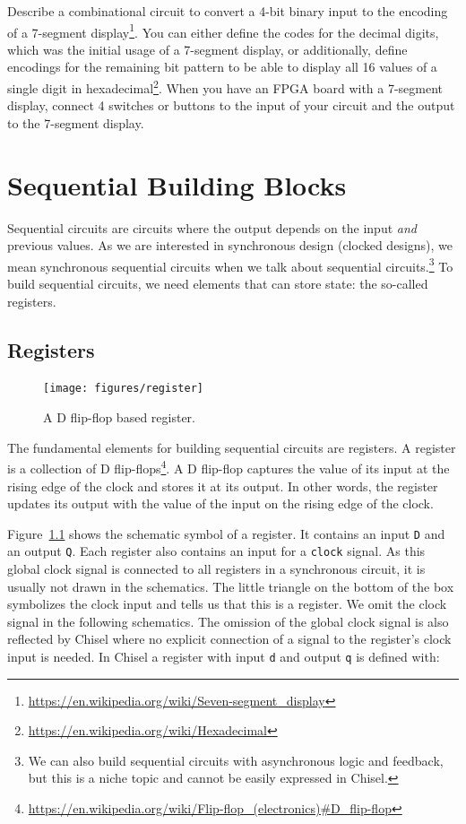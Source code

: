 \documentclass[%
    10pt,
    headinclude, footexclude,
    openright, %
    notitlepage,
    cleardoubleempty,
    headsepline,
    pointlessnumbers,
    bibtotoc, idxtotoc,
    ]{scrbook}
\newcommand{\code}[1]{{\lstinline[basicstyle=\small\ttfamily]{#1}}}
\newcommand{\myref}[2]{\href{#1}{#2}}
\renewcommand{\myref}[2]{{#2}{\footnote{\url{#1}}}}
\begin{document}
Describe a combinational circuit to convert a 4-bit binary input to the encoding of a
\myref{https://en.wikipedia.org/wiki/Seven-segment_display}{7-segment display}.
You can either define the codes for the decimal digits, which was the initial
usage of a 7-segment display, or additionally, define encodings for the remaining bit pattern
to be able to display all 16 values of a single digit in
\myref{https://en.wikipedia.org/wiki/Hexadecimal}{hexadecimal}.
When you have an FPGA board with a 7-segment display, connect 4 switches or
buttons to the input of your circuit and the output to the 7-segment display.

\chapter{Sequential Building Blocks}
\label{sec:sequential}

Sequential circuits are circuits where the output depends on the input \emph{and}
previous values. As we are interested in synchronous design (clocked designs),
we mean synchronous sequential circuits when we talk about sequential
circuits.\footnote{We can also build sequential circuits with asynchronous logic and
feedback, but this is a niche topic and cannot be easily expressed in Chisel.}
To build sequential circuits, we need elements that can store state:
the so-called registers.

\section{Registers}


\begin{figure}
  \centering
  \texttt{[image: figures/register]}
  \caption{A D flip-flop based register.}
  \label{fig:register}
\end{figure}

The fundamental elements for building sequential circuits are registers. A register is a collection
of \myref{https://en.wikipedia.org/wiki/Flip-flop_(electronics)\#D_flip-flop}{D flip-flops}.
A D flip-flop captures the value of its input at the rising edge of the clock and stores
it at its output. In other words, the register updates its output with the value of the input on the rising edge of the clock. %

Figure~\ref{fig:register} shows the schematic symbol of a register. It contains an input
\code{D} and an output \code{Q}. Each register also contains an input for a \code{clock} signal.
As this global clock signal is connected to all registers in a synchronous circuit, it is usually
not drawn in the schematics. The little triangle on the bottom of the box symbolizes the
clock input and tells us that this is a register. We omit the clock signal in the following
schematics.
The omission of the global clock signal is also reflected by Chisel where no explicit
connection of a signal to the register's clock input is needed.
In Chisel a register with input \code{d} and output \code{q} is defined with:
\end{document}
